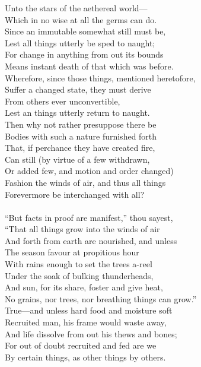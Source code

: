 Unto the stars of the aethereal world—\\
Which in no wise at all the germs can do.\\
Since an immutable somewhat still must be,\\
Lest all things utterly be sped to naught;\\
For change in anything from out its bounds\\
Means instant death of that which was before.\\
Wherefore, since those things, mentioned heretofore,\\
Suffer a changed state, they must derive\\
From others ever unconvertible,\\
Lest an things utterly return to naught.\\
Then why not rather presuppose there be\\
Bodies with such a nature furnished forth\\
That, if perchance they have created fire,\\
Can still (by virtue of a few withdrawn,\\
Or added few, and motion and order changed)\\
Fashion the winds of air, and thus all things\\
Forevermore be interchanged with all?\\
\\
``But facts in proof are manifest,'' thou sayest,\\
``That all things grow into the winds of air\\
And forth from earth are nourished, and unless\\
The season favour at propitious hour\\
With rains enough to set the trees a-reel\\
Under the soak of bulking thunderheads,\\
And sun, for its share, foster and give heat,\\
No grains, nor trees, nor breathing things can grow.''\\
True—and unless hard food and moisture soft\\
Recruited man, his frame would waste away,\\
And life dissolve from out his thews and bones;\\
For out of doubt recruited and fed are we\\
By certain things, as other things by others.\\
